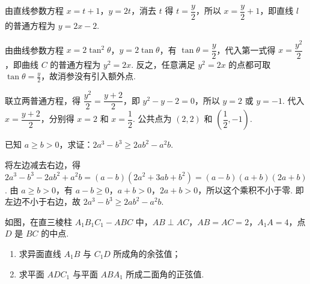 \begin{solution}
由直线参数方程 \(x=t+1\)，\(y=2t\)，消去 \(t\) 得 \(t=\dfrac y2\)，所以 \(x=\dfrac y2+1\)，即直线 \(l\) 的普通方程为 \(y=2x-2\).

由曲线参数方程 \(x=2\tan^2\theta\)，\(y=2\tan\theta\)，有 \(\tan\theta=\dfrac y2\)，代入第一式得 \(x=\dfrac{y^2}{2}\)，即曲线 \(C\) 的普通方程为 \(y^2=2x\). 反之，任意满足 \(y^2=2x\) 的点都可取 \(\tan\theta=\frac{y}{2}\)，故消参没有引入额外点.

联立两普通方程，得 \(\dfrac{y^2}{2}=\dfrac{y+2}{2}\)，即 \(y^2-y-2=0\)，所以 \(y=2\) 或 \(y=-1\). 代入 \(x=\dfrac{y+2}{2}\)，分别得 \(x=2\) 和 \(x=\dfrac12\). 公共点为 \((2,2)\) 和 \(\left(\dfrac12,-1\right)\).
\end{solution}

\reuseproblemnumber
\begin{problem}[D]
已知 \(a\geqslant b>0\)，求证：\(2a^3-b^3\geqslant 2ab^2-a^2b\).
\end{problem}

\begin{solution}
将左边减去右边，得
\(2a^3-b^3-2ab^2+a^2b=(a-b)(2a^2+3ab+b^2)=(a-b)(a+b)(2a+b)\).
由 \(a\geqslant b>0\)，有 \(a-b\geqslant0\)，\(a+b>0\)，\(2a+b>0\)，所以这个乘积不小于零. 即左边不小于右边，故
\(2a^3-b^3\geqslant2ab^2-a^2b\).
\end{solution}

\begin{problem}
如图，在直三棱柱 \(A_1B_1C_1-ABC\) 中，\(AB\perp AC\)，\(AB=AC=2\)，\(A_1A=4\)，点 \(D\) 是 \(BC\) 的中点.

\begin{enumerate}
\item 求异面直线 \(A_1B\) 与 \(C_1D\) 所成角的余弦值；
\item 求平面 \(ADC_1\) 与平面 \(ABA_1\) 所成二面角的正弦值.
\end{enumerate}

\end{problem}

